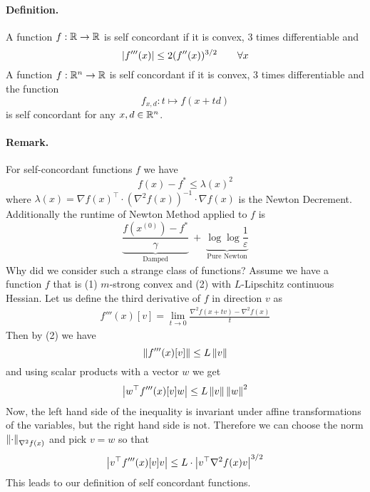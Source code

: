 \documentclass[answers]{exam}
\begin{document}
    \paragraph{Definition.} A function $f:\mathbb{R} \to \mathbb{R}$ is self concordant if it is convex, 3 times differentiable and 
    $$ \left| f'''(x) \right| \leq 2(f''(x))^{3/2}\quad \quad \forall x $$
    A function $f:\mathbb{R}^n \to \mathbb{R}$ is self concordant if it is convex, 3 times differentiable and the function 
    $$ f_{x,d}: t\mapsto f(x+ td) $$
    is self concordant for any $x, d\in \mathbb{R}^n$.
    \paragraph{Remark.} For self-concordant functions $f$ we have 
    $$ f(x) - f^* \leq \lambda(x)^2 $$
    where $\lambda(x) = \nabla f(x)^{\top} \cdot (\nabla^2 f(x))^{-1}\cdot \nabla f(x)$ is the Newton Decrement. Additionally the runtime of Newton Method applied to $f$ is 
    $$ \underbrace{\frac{f(x^{(0)}) - f^*}{\gamma}}_{\text{Damped}}\ +\ \underbrace{\log\log \frac{1}{\varepsilon}}_{\text{Pure Newton}} $$
    Why did we consider such a strange class of functions? Assume we have a function $f$ that is (1) $m$-strong convex and (2) with $L$-Lipschitz continuous Hessian. Let us define the third derivative of $f$ in direction $v$ as 
    \begin{align*}
        f'''(x)[v] = \lim_{t\to 0} \frac{\nabla^2 f(x+tv) - \nabla^2 f(x)}{t}
    \end{align*}
    Then by (2) we have 
    $$\left\lVert f'''(x)[v] \right\rVert \leq L \left\lVert v \right\rVert$$
    and using scalar products with a vector $w$ we get 
    $$ \left| w^\top f'''(x)[v] w \right| \leq L\left\lVert v \right\rVert\left\lVert w \right\rVert^2 $$
    Now, the left hand side of the inequality is invariant under affine transformations of the variables, but the right hand side is not. Therefore we can choose the norm $\left\lVert \cdot \right\rVert_{\nabla^2 f(x)}$ and pick $v=w$ so that 
    $$ \left| v^\top f'''(x)[v] v \right| \leq L\cdot \left| v^\top \nabla^2 f(x) v \right|^{3/2}  $$
    This leads to our definition of self concordant functions.
\end{document}
